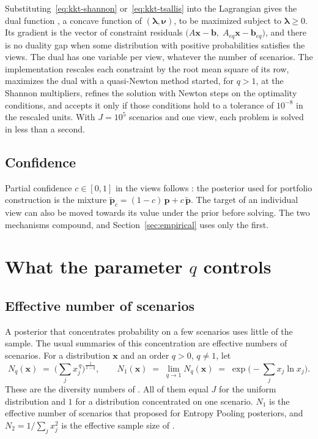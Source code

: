 \documentclass[11pt]{article}
\newcommand{\p}{\mathbf{p}}
\newcommand{\pt}{\tilde{\mathbf{p}}}
\newcommand{\x}{\mathbf{x}}
\begin{document}
Substituting~\eqref{eq:kkt-shannon} or~\eqref{eq:kkt-tsallis} into the
Lagrangian gives the dual function \citep{BorweinLewis1991}, a concave
function of
$(\boldsymbol{\lambda}, \boldsymbol{\nu})$, to be maximized subject to
$\boldsymbol{\lambda} \ge 0$. Its gradient is the vector of constraint
residuals
$\big(A\x - \mathbf{b},\; A_{eq}\x - \mathbf{b}_{eq}\big)$, and there is no
duality gap when some distribution with positive probabilities satisfies
the views. The dual has one variable per view, whatever the number of
scenarios.
The implementation rescales each constraint by the root mean square of its
row, maximizes the dual with a quasi-Newton method started, for $q>1$, at
the Shannon multipliers, refines the solution with Newton steps on the
optimality conditions, and accepts it only if those conditions hold to a
tolerance of $10^{-8}$ in the rescaled units. With $J = 10^5$ scenarios and
one view, each problem is solved in less than a second.

\subsection{Confidence}

Partial confidence $c \in [0,1]$ in the views follows \citet{Meucci2008}:
the posterior used for portfolio construction is the mixture
$\pt_c = (1-c)\,\p + c\,\pt$. The target of an individual view can also be
moved towards its value under the prior before solving. The two mechanisms
compound, and Section~\ref{sec:empirical} uses only the first.

\section{What the parameter \texorpdfstring{$q$}{q} controls}\label{sec:optimalq}

\subsection{Effective number of scenarios}

A posterior that concentrates probability on a few scenarios uses little
of the sample. The usual summaries of this concentration are effective
numbers of scenarios. For a distribution $\x$ and an order $q>0$,
$q \ne 1$, let
\begin{equation}\label{eq:hill}
N_q(\x) \;=\; \Big( \sum_{j} x_j^{\,q} \Big)^{\frac{1}{1-q}},
\qquad
N_1(\x) \;=\; \lim_{q \to 1} N_q(\x) \;=\; \exp\!\Big( -\sum_j x_j \ln x_j \Big).
\end{equation}
These are the diversity numbers of \citet{Hill1973}. All of them equal $J$
for the uniform distribution and $1$ for a distribution concentrated on one
scenario. $N_1$ is the effective number of scenarios that
\citet{Meucci2012} proposed for Entropy Pooling posteriors, and
$N_2 = 1/\sum_j x_j^2$ is the effective sample size of \citet{Kish1965}.
\end{document}
